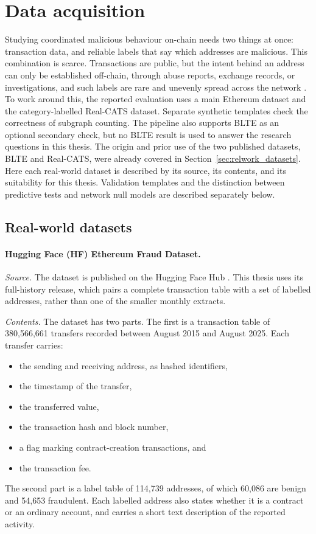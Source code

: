 \section{Data acquisition}
\label{sec:data_acquisition}

Studying coordinated malicious behaviour on-chain needs two things at once:
transaction data, and reliable labels that say which addresses are malicious.
This combination is scarce. Transactions are public, but the intent behind an
address can only be established off-chain, through abuse reports, exchange
records, or investigations, and such labels are rare and unevenly spread across
the network \citep{shi2025realcats}. To work around this, the reported
evaluation uses a main Ethereum dataset and the category-labelled Real-CATS
dataset. Separate synthetic templates check the correctness of subgraph
counting. The pipeline also supports BLTE as an optional secondary
check, but no BLTE result is used to answer the research questions in this
thesis. The origin and prior use of the two published datasets, BLTE and
Real-CATS, were already covered in Section~\ref{sec:relwork_datasets}. Here each
real-world dataset is described by its source, its contents, and its
suitability for this thesis. Validation templates and the distinction between
predictive tests and network null models are described separately below.

\subsection{Real-world datasets}

\paragraph{Hugging Face (HF) Ethereum Fraud Dataset.}
\label{sec:dataset_hf}
\textit{Source.} The dataset is published on the Hugging Face Hub
\citep{fesevu2025ethfraud}. This thesis uses its full-history release, which
pairs a complete transaction table with a set of labelled addresses, rather than
one of the smaller monthly extracts.

\textit{Contents.} The dataset has two parts. The first is a transaction table
of 380{,}566{,}661 transfers recorded between August 2015 and August 2025. Each
transfer carries:
\begin{itemize}
  \item the sending and receiving address, as hashed identifiers,
  \item the timestamp of the transfer,
  \item the transferred value,
  \item the transaction hash and block number,
  \item a flag marking contract-creation transactions, and
  \item the transaction fee.
\end{itemize}
The second part is a label table of 114{,}739 addresses, of which 60{,}086 are
benign and 54{,}653 fraudulent. Each labelled address also states whether it is
a contract or an ordinary account, and carries a short text description of the
reported activity.

